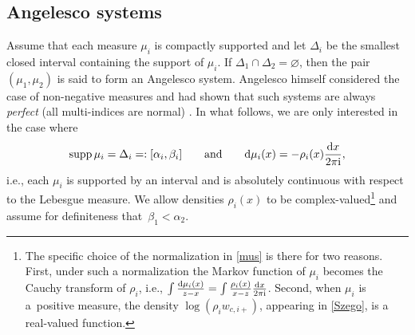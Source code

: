 \documentclass[pdftex]{sigma}
\numberwithin{equation}{section}
\newcommand{\ic}{\mathrm{i}}
\begin{document}
\subsection{Angelesco systems}

Assume that each measure $ \mu_i $ is compactly supported and let $ \Delta_i $ be the smallest closed interval containing the support of $ \mu_i $. If $ \Delta_1\cap \Delta_2 = \varnothing $, then the pair $ (\mu_1,\mu_2) $ is said to form an Angelesco system. Angelesco himself considered the case of non-negative measures and had shown that such systems are always \emph{perfect} (all multi-indices are normal) \cite{Ang19}. In what follows, we are only interested in the case where
\begin{equation}
\label{mus}
\operatorname{supp} \mu_i = \Delta_i =: [\alpha_i,\beta_i] \qquad \text{and}\qquad  {\rm d}\mu_i(x) = -\rho_i(x)\frac{{\rm d}x}{2\pi\ic},
\end{equation}
i.e., each $ \mu_i $ is supported by an interval and is absolutely continuous with respect to the Lebesgue measure. We allow densities $ \rho_i(x) $ to be complex-valued\footnote{The specific choice of the normalization in \eqref{mus} is there for two reasons. First, under such a normalization the Markov function of $ \mu_i $ becomes the Cauchy transform of $ \rho_i $, i.e., $ \int\frac{{\rm d}\mu_i(x)}{z-x}=\int\frac{\rho_i(x)}{x-z}\frac{{\rm d}x}{2\pi\ic} $. Second, when $ \mu_i $ is a~positive measure, the density $ \log(\rho_iw_{c,i+}) $, appearing in \eqref{Szego}, is a real-valued function.} and assume for definiteness that~${ \beta_1<\alpha_2} $.
\end{document}
